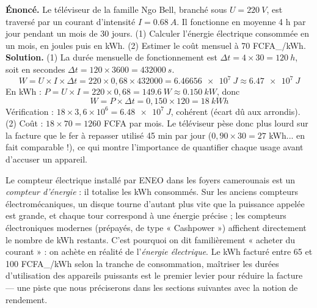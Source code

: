 \documentclass[11pt]{article}
\begin{document}
\begin{exoresolu}
\textbf{Énoncé.} Le téléviseur de la famille Ngo Bell, branché sous $U = \SI{220}{V}$, est traversé par un courant d'intensité $I = \SI{0,68}{A}$. Il fonctionne en moyenne 4 h par jour pendant un mois de 30 jours. (1) Calculer l'énergie électrique consommée en un mois, en joules puis en kWh. (2) Estimer le coût mensuel à 70 FCFA\_/kWh.
\tcblower
\textbf{Solution.} (1) La durée mensuelle de fonctionnement est $\Delta t = 4 \times 30 = \SI{120}{h}$, soit en secondes $\Delta t = 120 \times 3600 = \SI{432000}{s}$.
\[ W = U \times I \times \Delta t = 220 \times 0{,}68 \times 432000 = \SI{6,46656e7}{J} \approx \SI{6,47e7}{J} \]
En kWh : $P = U \times I = 220 \times 0{,}68 = \SI{149,6}{W} \approx \SI{0,150}{kW}$, donc
\[ W = P \times \Delta t = 0{,}150 \times 120 = \SI{18}{kWh} \]
Vérification : $18 \times 3{,}6 \times 10^{6} = \SI{6,48e7}{J}$, cohérent (écart dû aux arrondis). (2) Coût : $18 \times 70 = 1260$ FCFA par mois. Le téléviseur pèse donc plus lourd sur la facture que le fer à repasser utilisé 45 min par jour ($0{,}90 \times 30 = 27$ kWh... en fait comparable !), ce qui montre l'importance de quantifier chaque usage avant d'accuser un appareil.
\end{exoresolu}

\begin{savaistu}
Le compteur électrique installé par ENEO dans les foyers camerounais est un \emph{compteur d'énergie} : il totalise les kWh consommés. Sur les anciens compteurs électromécaniques, un disque tourne d'autant plus vite que la puissance appelée est grande, et chaque tour correspond à une énergie précise ; les compteurs électroniques modernes (prépayés, de type « Cashpower ») affichent directement le nombre de kWh restants. C'est pourquoi on dit familièrement « acheter du courant » : on achète en réalité de l'\emph{énergie électrique}. Le kWh facturé entre 65 et 100 FCFA\_/kWh selon la tranche de consommation, maîtriser les durées d'utilisation des appareils puissants est le premier levier pour réduire la facture — une piste que nous préciserons dans les sections suivantes avec la notion de rendement.
\end{savaistu}
\end{document}
